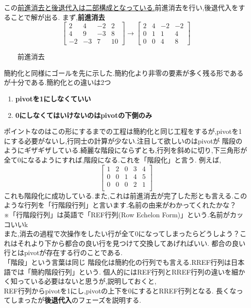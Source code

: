 この\underline{前進消去と後退代入は二部構成となっている.}前進消去を行い,後退代入をすることで解が出る.
\newpage
まず,\textbf{前進消去}
\[
\begin{bmatrix}
    2& 4 & -2 & 2 \\
    4 & 9 & -3 & 8 \\
    -2 & -3 & 7 & 10
\end{bmatrix}
\rightarrow
\begin{bmatrix}
    2& 4 & -2 & -2 \\
    0 & 1 & 1 & 4 \\
    0 & 0 & 4 & 8
\end{bmatrix}
\]
\begin{center}
    　　前進消去
\end{center}
簡約化と同様にゴールを先に示した.簡約化より非零の要素が多く残る形であるが十分である.簡約化との違いは2つ
\begin{enumerate}
    \item \textbf{pivotを1にしなくていい}
    \item \textbf{0にしなくてはいけないのはpivotの下側のみ}
\end{enumerate}
ポイントなのはこの形にするまでの工程は簡約化と同じ工程をするが,pivotを1にする必要がないし,行同士の計算が少ない.注目して欲しいのはpivotが
階段のようにギザギザしている.綺麗な階段にならずとも,行列を斜めに切り,下三角形が全て0になるようにすれば,階段になる.これを「階段化」と言う.
例えば,
\[
\begin{bmatrix}
    1 & 2 & 0 & 3 & 4 \\
    0 & 0 & 1 & 4 & 5 \\
    0 & 0 & 0 & 2 & 1 \\
\end{bmatrix}
\]
これも階段化に成功している.また,これは前進消去が完了した形とも言える.このような行列を「行階段行列」と言います.名前の由来がわかってくれたかな？\\
※「行階段行列」は英語で「REF行列(Row Echelon Form)」という.名前がカッコいいk\\
また,消去の過程で次操作をしたい行が全て0になってしまったらどうしよう？これはそれより下から都合の良い行を見つけて交換してあげればいい.
都合の良い行とはpivotが存在する行のことである.\\
「階段」という言葉は同じ
階段化は簡約化の行列でも言える.RREF行列は日本語では「簡約階段行列」という.
個人的にはREF行列とRREF行列の違いを細かく知っている必要はないと思うが,説明しておくと,\\
REF行列からpivotを1にし,pivotの上下を0にするとRREF行列となる.
長くなってしまったが\textbf{後退代入}のフェーズを説明する.
